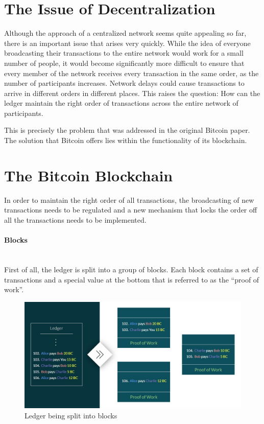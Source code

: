 \documentclass[a4paper, 12pt]{report}
\begin{document}
\section{The Issue of Decentralization}
\par Although the approach of a centralized network seems quite appealing so far, there is an important issue that arises very quickly. While the idea of everyone broadcasting their transactions to the entire network would work for a small number of people, it would become significantly more difficult to ensure that every member of the network receives every transaction in the same order, as the number of participants increases. Network delays could cause transactions to arrive in different orders in different places. This raises the question: How can the ledger maintain the right order of transactions across the entire network of participants. 
\par This is precisely the problem that was addressed in the original Bitcoin paper. The solution that Bitcoin offers lies within the functionality of its blockchain.

\section{The Bitcoin Blockchain}
\par In order to maintain the right order of all transactions, the broadcasting of new transactions needs to be regulated and a new mechanism that locks the order off all the transactions needs to be implemented.
\paragraph{Blocks} \hspace{0pt} \\
First of all, the ledger is split into a group of blocks. Each block contains a set of transactions and a special value at the bottom that is referred to as the “proof of work”. 

\begin{figure}[h]
	\includegraphics[width=\textwidth]{02_Ledger_Blocks}
	\caption{Ledger being split into blocks}
	\label{fig:02_Ledger_Blocks}
\end{figure}
\end{document}
